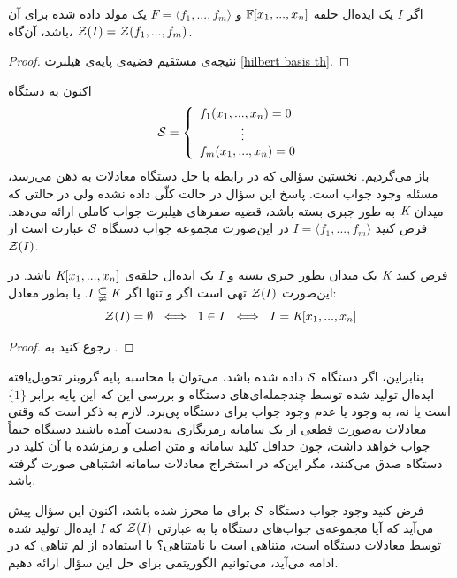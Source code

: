 \begin{theorem}
	اگر 
	$I$
	یک ایده‌ال حلقه‌ 
	$\mathbb{F}[x_{1},...,x_{n}]$
	و 
	$F = \langle f_{1},...,f_{m}\rangle$
	یک مولد داده شده برای آن باشد، آن‌گاه، 
	${\mathcal Z}(I) = {\mathcal Z}(f_{1},...,f_{m})$.
\end{theorem}
\begin{proof}
	نتیجه‌ی مستقیم قضیه‌ی پایه‌ی هیلبرت 
	\ref{hilbert basis th}.
\end{proof}
اکنون به دستگاه 
\begin{align*}
{\mathcal S} = \left\{
\begin{array}{lr}
f_{1}(x_{1},...,x_{n}) = 0\\
\ \ \ \ \ \ \ \ \  \ \vdots\\
f_{m}(x_{1},...,x_{n}) = 0	
\end{array}\right.
\end{align*}
باز می‌گردیم.  نخستین سؤالی که در رابطه با حل دستگاه معادلات به ذهن می‌رسد، مسئله‌  وجود جواب است. پاسخ این سؤال در حالت کلّی داده نشده ولی در حالتی که میدان 
$\textit{K}$
به طور جبری بسته باشد، قضیه‌  صفرهای هیلبرت جواب کاملی ارائه می‌دهد. 
فرض کنید 
$I = \langle f_{1},...,f_{m}\rangle$
در این‌صورت مجموعه‌  جواب دستگاه 
${\mathcal S}$
عبارت است از 
${\mathcal Z}(I)$.

\begin{theorem}
	فرض کنید 
	$\textit{K}$
	یک میدان بطور جبری بسته و
	$I$
	یک ایده‌ال حلقه‌ی 
	$\textit{K}[x_{1},...,x_{n}]$
	باشد. در این‌صورت 
	${\mathcal Z}(I)$
	تهی است اگر و تنها اگر 
	$I\subsetneqq \textit{K}$.
	یا بطور معادل:
	$${\mathcal Z}(I) = \emptyset \  \iff \ 1\in I \ \iff \ I = \textit{K}[x_{1},...,x_{n}]$$
\end{theorem}
\begin{proof}
	رجوع کنید به 
	\cite[ص.۱۷۷]{IVAcox}.
\end{proof}
بنابراین، اگر دستگاه 
${\mathcal S}$
داده شده باشد، می‌توان با محاسبه‌  پایه‌  گروبنر تحویل‌یافته‌  ایده‌ال تولید شده توسط چندجمله‌ای‌های دستگاه و بررسی این که این پایه برابر 
$\{1\}$
است یا نه، به وجود  یا عدم وجود جواب  برای دستگاه پی‌برد. لازم به ذکر است که وقتی معادلات به‌صورت قطعی   از یک سامانه‌  رمزنگاری به‌دست  آمده‌ باشند دستگاه حتماً جواب خواهد داشت، چون حداقل کلید سامانه و متن اصلی و رمزشده با آن کلید در دستگاه صدق می‌کنند، مگر این‌که در استخراج معادلات سامانه اشتباهی صورت گرفته باشد. 

فرض کنید وجود جواب دستگاه 
${\mathcal S}$
برای ما محرز شده باشد، اکنون این سؤال پیش می‌آید که آیا مجموعه‌ی جواب‌های دستگاه یا به عبارتی 
${\mathcal Z}(I)$
که 
$I$
ایده‌ال تولید شده توسط معادلات دستگاه است، متناهی است یا نامتناهی؟  یا استفاده از لم تناهی که در ادامه می‌آید، می‌توانیم الگوریتمی برای حل این سؤال ارائه دهیم.


